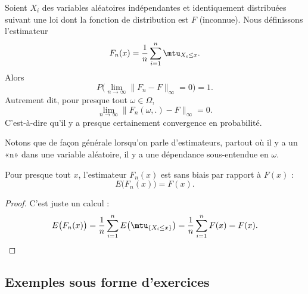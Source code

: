 \begin{theorem}  \label{ThoXAEMbTI}
	Soient \( X_i\) des variables aléatoires indépendantes et identiquement distribuées suivant une loi dont la fonction de distribution est \( F\) (inconnue). Nous définissons l'estimateur
	\begin{equation}    \label{EqMQNRVcT}
		F_n(x)=\frac{1}{ n }\sum_{i=1}^n\mtu_{X_i\leq x}.
	\end{equation}
	Alors
	\begin{equation}
		P\big( \lim_{n\to \infty} \| F_n-F \|_{\infty}=0 \big)=1.
	\end{equation}
	Autrement dit, pour presque tout \( \omega \in \Omega\),
	\begin{equation}
		\lim_{n\to \infty} \| F_n(\omega,.)-F \|_{\infty}=0.
	\end{equation}
	C'est-à-dire qu'il y a presque certainement convergence en probabilité.
\end{theorem}
Notons que de façon générale lorsqu'on parle d'estimateurs, partout où il y a un «n» dans une variable aléatoire, il y a une dépendance sous-entendue en \( \omega\).

\begin{proposition} \label{PropHSHFbEq}
	Pour presque tout \( x\), l'estimateur \( F_n(x)\) est sans biais par rapport à \( F(x)\) :
	\begin{equation}
		E\big( F_n(x) \big)=F(x).
	\end{equation}
\end{proposition}

\begin{proof}
	C'est juste un calcul :
	\begin{equation}
		E\big( F_n(x) \big)=\frac{1}{ n }\sum_{i=1}^nE\big( \mtu_{\{ X_i\leq x \}} \big)=\frac{1}{n }\sum_{i=1}^nF(x)=F(x).
	\end{equation}
\end{proof}


\subsection{Exemples sous forme d'exercices}


